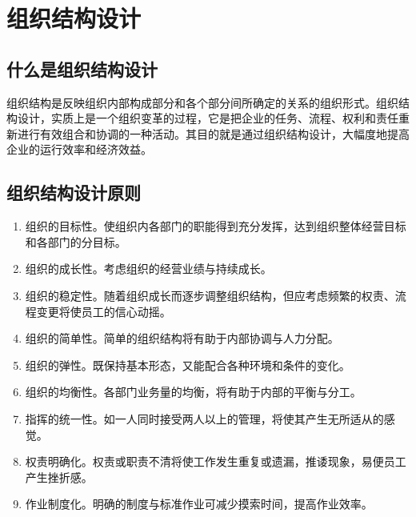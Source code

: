 \section {组织结构设计}

    \subsection {什么是组织结构设计}

    组织结构是反映组织内部构成部分和各个部分间所确定的关系的组织形式。组织结构设计，实质上是一个组织变革的过程，它是把企业的任务、流程、权利和责任重新进行有效组合和协调的一种活动。其目的就是通过组织结构设计，大幅度地提高企业的运行效率和经济效益。

    \subsection {组织结构设计原则}

        \begin{enumerate}
            \item 组织的目标性。使组织内各部门的职能得到充分发挥，达到组织整体经营目标和各部门的分目标。

            \item 组织的成长性。考虑组织的经营业绩与持续成长。

            \item 组织的稳定性。随着组织成长而逐步调整组织结构，但应考虑频繁的权责、流程变更将使员工的信心动摇。

            \item 组织的简单性。简单的组织结构将有助于内部协调与人力分配。

            \item 组织的弹性。既保持基本形态，又能配合各种环境和条件的变化。

            \item 组织的均衡性。各部门业务量的均衡，将有助于内部的平衡与分工。

            \item 指挥的统一性。如一人同时接受两人以上的管理，将使其产生无所适从的感觉。

            \item 权责明确化。权责或职责不清将使工作发生重复或遗漏，推诿现象，易便员工产生挫折感。

            \item 作业制度化。明确的制度与标准作业可减少摸索时间，提高作业效率。
        \end{enumerate}

